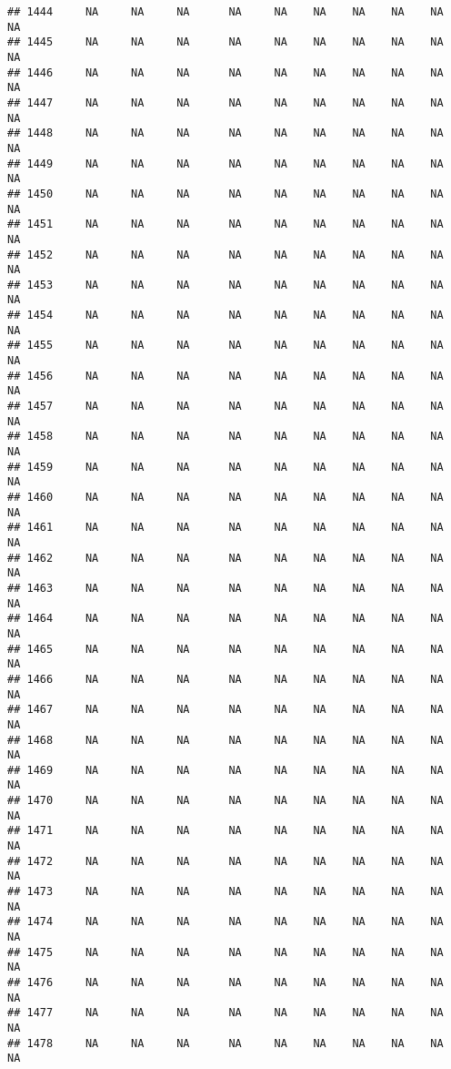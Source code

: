 \documentclass{article}\usepackage{graphicx, color}
\makeatletter
\newenvironment{kframe}{%
 \def\at@end@of@kframe{}%
 \ifinner\ifhmode%
  \def\at@end@of@kframe{\end{minipage}}%
  \begin{minipage}{\columnwidth}%
 \fi\fi%
 \def\FrameCommand##1{\hskip\@totalleftmargin \hskip-\fboxsep
 \colorbox{shadecolor}{##1}\hskip-\fboxsep
     \hskip-\linewidth \hskip-\@totalleftmargin \hskip\columnwidth}%
 \MakeFramed {\advance\hsize-\width
   \@totalleftmargin\z@ \linewidth\hsize
   \@setminipage}}%
 {\par\unskip\endMakeFramed%
 \at@end@of@kframe}
\newenvironment{knitrout}{}{} %
\makeatother
\begin{document}
\begin{knitrout}
\begin{kframe}
\begin{verbatim}
## 1444     NA     NA     NA      NA     NA    NA    NA    NA    NA     NA
## 1445     NA     NA     NA      NA     NA    NA    NA    NA    NA     NA
## 1446     NA     NA     NA      NA     NA    NA    NA    NA    NA     NA
## 1447     NA     NA     NA      NA     NA    NA    NA    NA    NA     NA
## 1448     NA     NA     NA      NA     NA    NA    NA    NA    NA     NA
## 1449     NA     NA     NA      NA     NA    NA    NA    NA    NA     NA
## 1450     NA     NA     NA      NA     NA    NA    NA    NA    NA     NA
## 1451     NA     NA     NA      NA     NA    NA    NA    NA    NA     NA
## 1452     NA     NA     NA      NA     NA    NA    NA    NA    NA     NA
## 1453     NA     NA     NA      NA     NA    NA    NA    NA    NA     NA
## 1454     NA     NA     NA      NA     NA    NA    NA    NA    NA     NA
## 1455     NA     NA     NA      NA     NA    NA    NA    NA    NA     NA
## 1456     NA     NA     NA      NA     NA    NA    NA    NA    NA     NA
## 1457     NA     NA     NA      NA     NA    NA    NA    NA    NA     NA
## 1458     NA     NA     NA      NA     NA    NA    NA    NA    NA     NA
## 1459     NA     NA     NA      NA     NA    NA    NA    NA    NA     NA
## 1460     NA     NA     NA      NA     NA    NA    NA    NA    NA     NA
## 1461     NA     NA     NA      NA     NA    NA    NA    NA    NA     NA
## 1462     NA     NA     NA      NA     NA    NA    NA    NA    NA     NA
## 1463     NA     NA     NA      NA     NA    NA    NA    NA    NA     NA
## 1464     NA     NA     NA      NA     NA    NA    NA    NA    NA     NA
## 1465     NA     NA     NA      NA     NA    NA    NA    NA    NA     NA
## 1466     NA     NA     NA      NA     NA    NA    NA    NA    NA     NA
## 1467     NA     NA     NA      NA     NA    NA    NA    NA    NA     NA
## 1468     NA     NA     NA      NA     NA    NA    NA    NA    NA     NA
## 1469     NA     NA     NA      NA     NA    NA    NA    NA    NA     NA
## 1470     NA     NA     NA      NA     NA    NA    NA    NA    NA     NA
## 1471     NA     NA     NA      NA     NA    NA    NA    NA    NA     NA
## 1472     NA     NA     NA      NA     NA    NA    NA    NA    NA     NA
## 1473     NA     NA     NA      NA     NA    NA    NA    NA    NA     NA
## 1474     NA     NA     NA      NA     NA    NA    NA    NA    NA     NA
## 1475     NA     NA     NA      NA     NA    NA    NA    NA    NA     NA
## 1476     NA     NA     NA      NA     NA    NA    NA    NA    NA     NA
## 1477     NA     NA     NA      NA     NA    NA    NA    NA    NA     NA
## 1478     NA     NA     NA      NA     NA    NA    NA    NA    NA     NA

\end{verbatim}
\end{kframe}
\end{knitrout}
\end{document}
